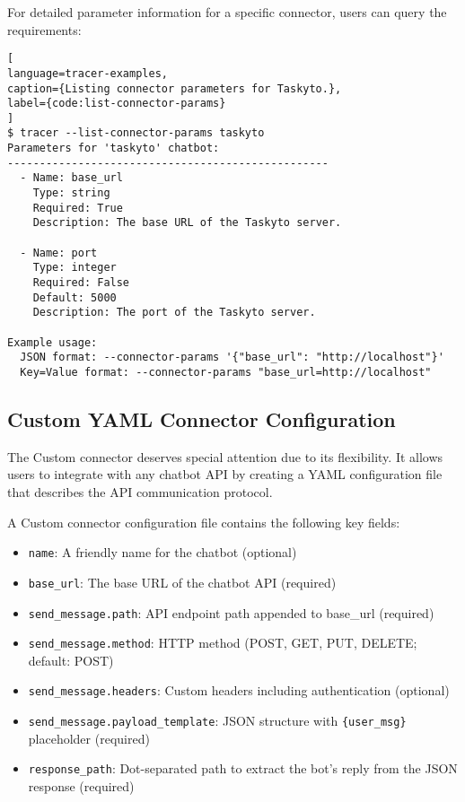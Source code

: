 For detailed parameter information for a specific connector,
users can query the requirements:

\begin{lstlisting}[
language=tracer-examples,
caption={Listing connector parameters for Taskyto.},
label={code:list-connector-params}
]
$ tracer --list-connector-params taskyto
Parameters for 'taskyto' chatbot:
--------------------------------------------------
  - Name: base_url
    Type: string
    Required: True
    Description: The base URL of the Taskyto server.

  - Name: port
    Type: integer
    Required: False
    Default: 5000
    Description: The port of the Taskyto server.

Example usage:
  JSON format: --connector-params '{"base_url": "http://localhost"}'
  Key=Value format: --connector-params "base_url=http://localhost"
\end{lstlisting}

\subsection{Custom YAML Connector Configuration}

The Custom connector deserves special attention due to its flexibility.
It allows users to integrate with any chatbot \ac{API}
by creating a YAML configuration file that describes
the \ac{API} communication protocol.

A Custom connector configuration file contains the following key fields:

\begin{itemize}
    \item \texttt{name}: A friendly name for the chatbot (optional)
    \item \texttt{base\_url}: The base \acs{URL} of the chatbot \ac{API} (required)
    \item \texttt{send\_message.path}: \ac{API} endpoint path appended to base\_url (required)
    \item \texttt{send\_message.method}: \acs{HTTP} method (POST, GET, PUT, DELETE; default: POST)
    \item \texttt{send\_message.headers}: Custom headers including authentication (optional)
    \item \texttt{send\_message.payload\_template}: \acs{JSON} structure with \texttt{\{user\_msg\}} placeholder (required)
    \item \texttt{response\_path}: Dot-separated path to extract the bot's reply from the \acs{JSON} response (required)
\end{itemize}

